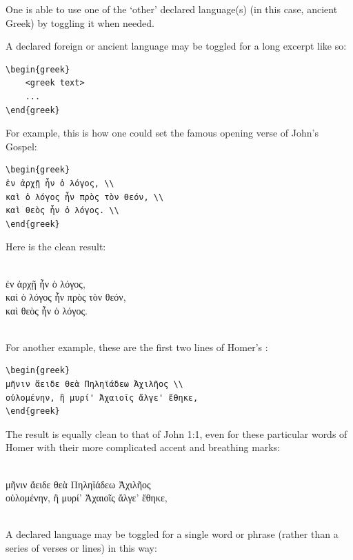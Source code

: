 \documentclass{ltugboat}
\begin{document}
One is able to use one of the `other' declared language(s) (in this case, ancient Greek) by toggling it when needed.

A declared foreign or ancient language may be toggled for a long excerpt like so:

\begin{verbatim}
\begin{greek}
	<greek text>
	...
\end{greek}
\end{verbatim}
For example, this is how one could set the famous opening verse of John's Gospel:

\begin{verbatim}
\begin{greek}
ἐν ἀρχῇ ἦν ὁ λόγος, \\
καὶ ὁ λόγος ἦν πρὸς τὸν θεόν, \\
καὶ θεὸς ἦν ὁ λόγος. \\
\end{greek}
\end{verbatim}
%
Here is the clean result:
%
\begin{greek} \\
ἐν ἀρχῇ ἦν ὁ λόγος, \\
καὶ ὁ λόγος ἦν πρὸς τὸν θεόν, \\
καὶ θεὸς ἦν ὁ λόγος. \\
\end{greek} 
\\
For another example, these are the first two lines of Homer's :

\begin{verbatim}
\begin{greek}
μῆνιν ἄειδε θεὰ Πηληϊάδεω Ἀχιλῆος \\
οὐλομένην, ἣ μυρί' Ἀχαιοῖς ἄλγε' ἔθηκε,
\end{greek}
\end{verbatim}
%
The result is equally clean to that of John 1:1, even for these particular words of Homer with their more complicated accent and breathing marks:
%
\begin{greek}\\
μῆνιν ἄειδε θεὰ Πηληϊάδεω Ἀχιλῆος \\
οὐλομένην, ἣ μυρί' Ἀχαιοῖς ἄλγε' ἔθηκε,
\end{greek} 
\\


A declared language may be toggled for a single word or phrase (rather than a series of verses or lines) in this way:
\end{document}
